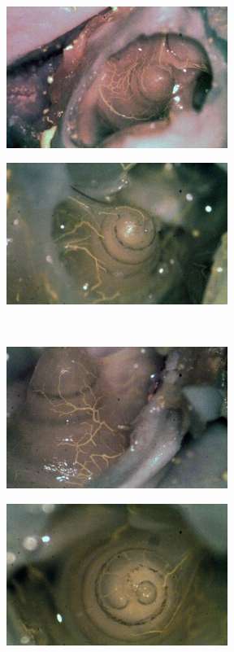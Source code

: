 \begin{figure}
    \centering
    \begin{subfigure}[t]{0.5\textwidth}
        \centering
        \includegraphics[height=4.6cm]{Simulations/Vasculature/26-05-12-18-24-05}
        \caption{}
        \label{fig:microfil_bulla}
    \end{subfigure}%
	\hfill%
	\begin{subfigure}[t]{0.5\textwidth}
        \centering
        \includegraphics[height=4.6cm]{Simulations/Vasculature/15-05-12-09-53-19}
        \caption{}
        \label{fig:microfil_apex}
    \end{subfigure}\\%
    \vspace{1em}
	\begin{subfigure}[t]{0.5\textwidth}
        \centering
        \includegraphics[height=4.6cm]{Simulations/Vasculature/26-05-12-17-47-56}
        \caption{}
        \label{fig:microfil_lateral}
    \end{subfigure}%
    \hfill%
    \begin{subfigure}[t]{0.5\textwidth}
        \centering
        \includegraphics[height=4.6cm]{Simulations/Vasculature/15-05-12-09-59-48}
        \caption{}
        \label{fig:microfil_radiating}
    \end{subfigure}\\%
    

\end{figure}
